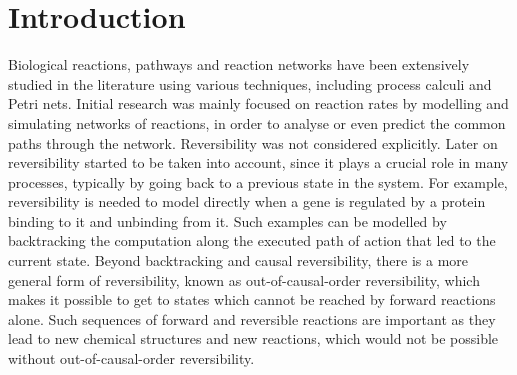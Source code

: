 \documentclass[runningheads]{llncs}
\begin{document}
\section{Introduction}

Biological reactions, pathways and reaction networks have been extensively studied in the literature using
various  techniques,  including  process  calculi and Petri nets.  Initial research was mainly focused  on
reaction rates by modelling and simulating networks of reactions, in order to
analyse or even predict the common paths through the network.  Reversibility
was not considered explicitly.  Later on
reversibility  started  to  be  taken  into  account,  since  it  plays  a  crucial  role  in
many processes, typically by going back to a previous state in the system.  For
example,  reversibility is needed to model directly when a gene is regulated by a protein binding to it and unbinding from it.  Such examples can
be modelled by backtracking the computation along the executed path of action that led to the current state.  Beyond
backtracking and causal reversibility, there is a more general form of reversibility, known as out-of-causal-order reversibility, which makes it possible to get
to states which cannot be reached by forward reactions alone.  Such sequences
of forward and reversible reactions are important as they lead to new chemical
structures and new reactions, which would not be possible without out-of-causal-order
reversibility.
\end{document}
